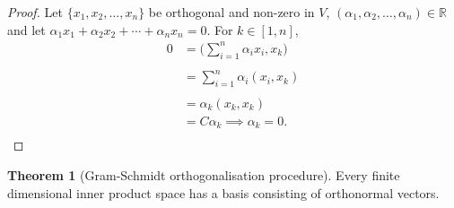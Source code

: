 \documentclass[11pt,a4paper]{article}
\theoremstyle{definition}
\newtheorem{thm}{Theorem}[subsection]
\begin{document}
\begin{proof}
Let $\{x_1,x_2,\dots,x_n\}$ be orthogonal and non-zero in $V$, $(\alpha_1,\alpha_2,\dots,\alpha_n)\in \mathbb{R}$ and let $\alpha_1x_1+\alpha_2x_2+\cdots+\alpha_nx_n=0$. For $k\in [1,n]$,
\begin{align*}
0 &=\Bigg(\sum^n_{i=1}\alpha_ix_i,x_k\Bigg)\\\\
  &=\sum^n_{i=1}\alpha_i(x_i,x_k)\\\\
  &=\alpha_k(x_k,x_k)\\
  &=C\alpha_k\implies \alpha_k=0.\\
\end{align*}
\end{proof}
\begin{thm}[Gram-Schmidt orthogonalisation procedure]\label{thm:gram-schmidt}
Every finite dimensional inner product space has a basis consisting of orthonormal vectors.
\end{thm}
\end{document}
